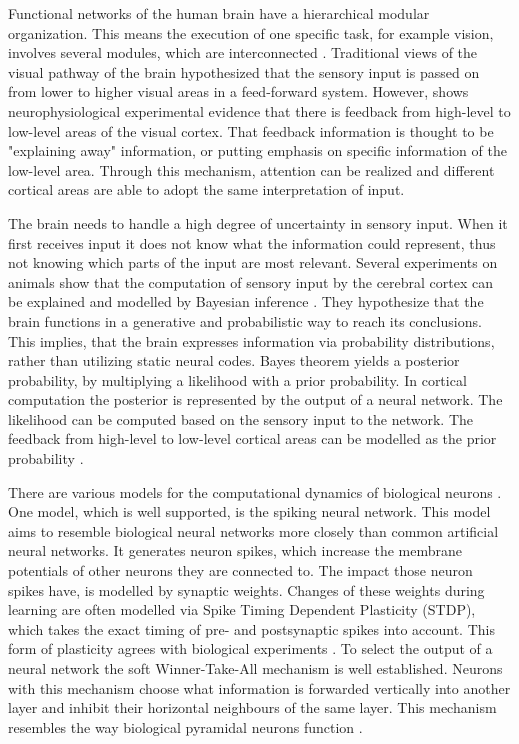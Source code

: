 Functional networks of the human brain have a hierarchical modular organization. This means the execution of one specific task, for example vision, involves several modules, which are interconnected  \citep{hierarchicalBrain}. Traditional views of the visual pathway of the brain hypothesized that the sensory input is passed on from lower to higher visual areas in a feed-forward system. However, \citet{HierachicalBayesVisualCortex} shows  neurophysiological experimental evidence that there is feedback from high-level to low-level areas of the visual cortex. That feedback information is thought to be "explaining away" information, or putting emphasis on specific information of the low-level area. Through this mechanism, attention can be realized and different cortical areas are able to adopt the same interpretation of  input.
 
The brain needs to handle a high degree of uncertainty in sensory input. When it first receives input it does not know what the information could represent, thus not knowing which parts of the input are most relevant. Several experiments on animals show that the computation of sensory input by the cerebral cortex can be explained and modelled by Bayesian inference \citep{neuralSubstrate, HierachicalBayesVisualCortex, anatomyOfInference}. They hypothesize that the brain functions in a generative and probabilistic way to reach its conclusions. This implies, that the brain expresses information via probability distributions, rather than utilizing static neural codes. 
Bayes theorem yields a posterior probability, by multiplying a likelihood with a prior probability. In cortical computation the posterior is  represented by the output of a neural network. The likelihood can be computed based on the sensory input to the network. The feedback from high-level to low-level cortical areas can be modelled as the prior probability \citep{nessler}.

There are various models for the computational dynamics of biological neurons \citep{SpikingNeuronModelsBook}. One model, which is well supported, is the spiking neural network. This model aims to resemble biological neural networks more closely than common artificial neural networks. It generates neuron spikes, which increase the membrane potentials of other neurons they are connected to. 
The impact those neuron spikes have, is modelled by synaptic weights. Changes of these weights during learning are often modelled via Spike Timing Dependent Plasticity (STDP), which takes the exact timing of pre- and postsynaptic spikes into account. This form of plasticity agrees with biological experiments \citep{STDPFELDMAN, STDPDAN}. To select the output of a neural network the soft Winner-Take-All mechanism is well established. Neurons with this mechanism choose what information is forwarded vertically into another layer and inhibit their horizontal neighbours of the same layer. This mechanism resembles the way biological pyramidal neurons function \citep{softWTA}.

